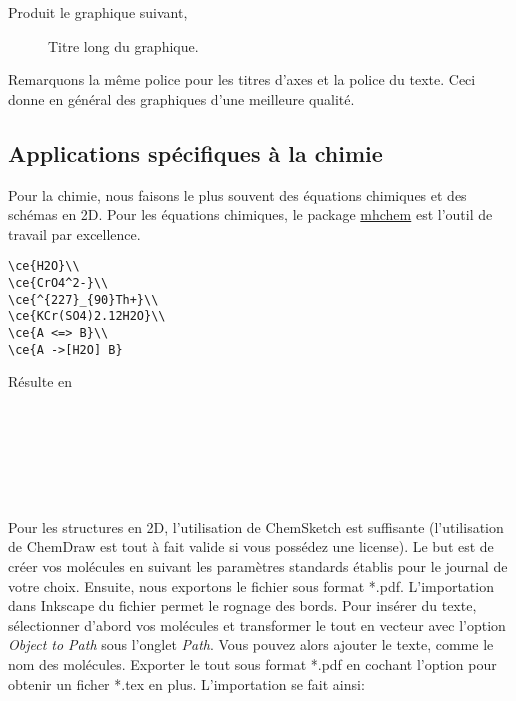 Produit le graphique suivant,

\begin{figure}[htbp]
  \centering
  
  \caption[Titre court du graphique]{Titre long du graphique.}
\end{figure}

Remarquons la même police pour les titres d'axes et la police du texte. Ceci donne en général des graphiques d'une meilleure qualité.

\subsection{Applications spécifiques à la chimie}

Pour la chimie, nous faisons le plus souvent des équations chimiques et des schémas en 2D. Pour les équations chimiques, le package \href{https://ctan.org/pkg/mhchem}{mhchem} est l'outil de travail par excellence.

\begin{verbatim}
\ce{H2O}\\
\ce{CrO4^2-}\\
\ce{^{227}_{90}Th+}\\
\ce{KCr(SO4)2.12H2O}\\
\ce{A <=> B}\\
\ce{A ->[H2O] B}
\end{verbatim}

Résulte en

\\
\\
\\
\\
\\

Pour les structures en 2D, l'utilisation de ChemSketch est suffisante (l'utilisation de ChemDraw est tout à fait valide si vous possédez une license). Le but est de créer vos molécules en suivant les paramètres standards établis pour le journal de votre choix. Ensuite, nous exportons le fichier sous format *.pdf. L'importation dans Inkscape du fichier permet le rognage des bords. Pour insérer du texte, sélectionner d'abord vos molécules et transformer le tout en vecteur avec l'option \textit{Object to Path} sous l'onglet \textit{Path}. Vous pouvez alors ajouter le texte, comme le nom des molécules. Exporter le tout sous format *.pdf en cochant l'option pour obtenir un ficher *.tex en plus. L'importation se fait ainsi:

